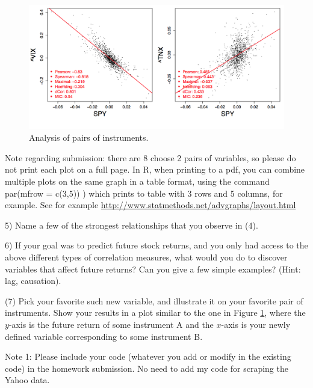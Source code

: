 \documentclass[12pt]{article}
\begin{document}
\begin{figure}[h!]
\begin{center}
\includegraphics[width=0.7\columnwidth]{pairs_2.png}
\end{center}
\caption{ Analysis of pairs of instruments. 
}
\label{figExample}
\end{figure}

Note regarding submission: there are 8 choose 2 pairs of variables, so please do not print each plot on a full page. In R, when printing to a pdf, you can combine multiple plots on the same graph in a table format, using the command par(mfrow = c(3,5)) ) which prints to table with 3 rows and 5 columns, for example. See for example \url{http://www.statmethods.net/advgraphs/layout.html}

\vspace{3mm}

5) Name a few of the strongest relationships that you observe in (4).

\vspace{3mm}

6) If your goal was to predict future stock returns, and you only had access to the above different types of correlation measures, what would you do to discover variables that affect future returns? Can you give a few simple examples? (Hint: lag, causation). 

\vspace{3mm}

(7) Pick your favorite such new variable, and illustrate it on your favorite pair of instruments. Show your results in a plot similar to the one in Figure \ref{figExample}, where the $y$-axis is the future return of some  instrument A and the $x$-axis is your newly defined variable corresponding to some instrument B.

\vspace{7mm}

Note 1: Please include your code (whatever you add or modify in the existing code) in the homework submission. No need to add my code for scraping the Yahoo data.
\end{document}
